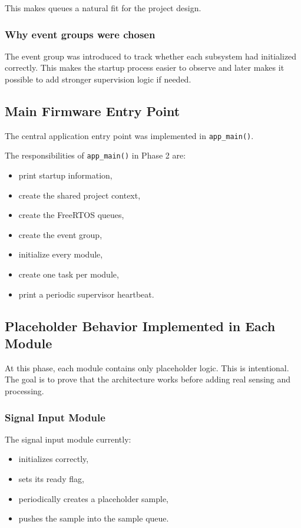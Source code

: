 \documentclass[12pt,a4paper]{article}
\begin{document}
This makes queues a natural fit for the project design.

\subsubsection*{Why event groups were chosen}

The event group was introduced to track whether each subsystem had initialized
correctly. This makes the startup process easier to observe and later makes it
possible to add stronger supervision logic if needed.

\subsection{Main Firmware Entry Point}

The central application entry point was implemented in \texttt{app\_main()}.

The responsibilities of \texttt{app\_main()} in Phase 2 are:

\begin{itemize}
    \item print startup information,
    \item create the shared project context,
    \item create the FreeRTOS queues,
    \item create the event group,
    \item initialize every module,
    \item create one task per module,
    \item print a periodic supervisor heartbeat.
\end{itemize}

\subsection{Placeholder Behavior Implemented in Each Module}

At this phase, each module contains only placeholder logic. This is
intentional. The goal is to prove that the architecture works before adding
real sensing and processing.

\subsubsection{Signal Input Module}

The signal input module currently:

\begin{itemize}
    \item initializes correctly,
    \item sets its ready flag,
    \item periodically creates a placeholder sample,
    \item pushes the sample into the sample queue.
\end{itemize}
\end{document}
